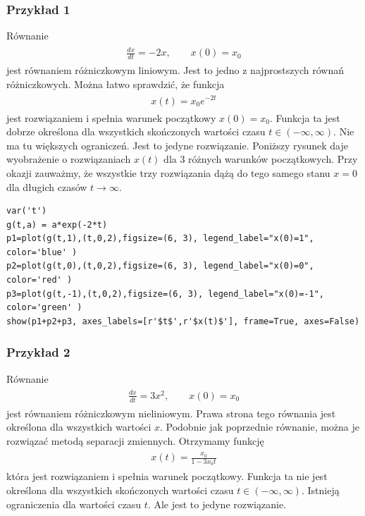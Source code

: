 \documentclass[a4paper,12pt,polish]{sphinxmanual}
\begin{document}
\subsubsection{Przykład 1}
\label{ch1/chI021:przyklad-1}
Równanie
\label{ch1/chI021:equation-eqn8}\begin{gather}
\begin{split}\frac{dx}{dt}=-2x, \qquad x(0) = x_0\end{split}\label{ch1/chI021-eqn8}
\end{gather}
jest równaniem różniczkowym liniowym. Jest to jedno z najprostszych równań różniczkowych.  Można łatwo sprawdzić, że funkcja
\label{ch1/chI021:equation-eqn9}\begin{gather}
\begin{split}x(t) = x_0   e^{-2t}\end{split}\label{ch1/chI021-eqn9}
\end{gather}
jest rozwiązaniem i spełnia warunek początkowy $x(0) = x_0$. Funkcja ta jest dobrze określona dla wszystkich skończonych  wartości czasu $t \in (-\infty, \infty)$.  Nie ma tu większych ograniczeń.  Jest to jedyne rozwiązanie.  Poniższy rysunek daje wyobrażenie o rozwiązaniach $x(t)$ dla 3 różnych warunków początkowych. Przy okazji zauważmy, że wszystkie trzy rozwiązania dążą do tego samego stanu $x=0$  dla długich czasów $t\to \infty$.


\begin{verbatim}
var('t')
g(t,a) = a*exp(-2*t)
p1=plot(g(t,1),(t,0,2),figsize=(6, 3), legend_label="x(0)=1", color='blue' )
p2=plot(g(t,0),(t,0,2),figsize=(6, 3), legend_label="x(0)=0", color='red' )
p3=plot(g(t,-1),(t,0,2),figsize=(6, 3), legend_label="x(0)=-1", color='green' )
show(p1+p2+p3, axes_labels=[r'$t$',r'$x(t)$'], frame=True, axes=False)
\end{verbatim}



\subsubsection{Przykład 2}
\label{ch1/chI021:przyklad-2}
Równanie
\label{ch1/chI021:equation-eqn10}\begin{gather}
\begin{split}\frac{dx}{dt}= 3 x^2, \qquad x(0) = x_0\end{split}\label{ch1/chI021-eqn10}
\end{gather}
jest równaniem różniczkowym nieliniowym.   Prawa strona tego równania jest określona dla wszystkich wartości $x$. Podobnie jak poprzednie równanie, można  je rozwiązać metodą separacji zmiennych. Otrzymamy funkcję
\label{ch1/chI021:equation-eqn11}\begin{gather}
\begin{split}x(t) = \frac{x_0}{1-3 x_0 t}\end{split}\label{ch1/chI021-eqn11}
\end{gather}
która jest rozwiązaniem i spełnia warunek początkowy. Funkcja ta nie jest określona dla wszystkich skończonych  wartości czasu $t \in (-\infty, \infty)$.  Istnieją  ograniczenia dla wartości czasu $t$. Ale jest to jedyne rozwiązanie.
\end{document}
